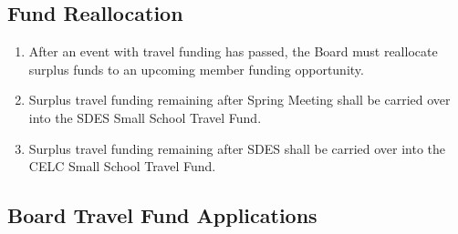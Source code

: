 \subsection{Fund Reallocation}
\label{fund-reallocation}

\begin{enumerate}
 \item
  After an event with travel funding has passed, the Board must reallocate surplus funds to an upcoming member funding opportunity.
 \item
  Surplus travel funding remaining after Spring Meeting shall be carried over into the SDES Small School Travel Fund.
 \item
  Surplus travel funding remaining after SDES shall be carried over into the CELC Small School Travel Fund.
\end{enumerate}

\subsection{Board Travel Fund Applications}
\label{board-travel-fund-applications}

